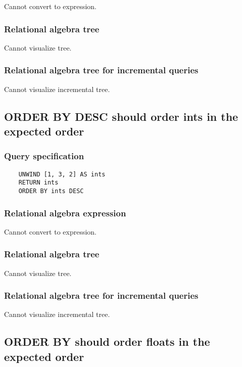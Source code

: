 	Cannot convert to expression.

	\subsubsection*{Relational algebra tree}

	Cannot visualize tree.

	\subsubsection*{Relational algebra tree for incremental queries}

	Cannot visualize incremental tree.
	\subsection{ORDER BY DESC should order ints in the expected order}

	\subsubsection*{Query specification}

	\begin{lstlisting}
	UNWIND [1, 3, 2] AS ints
	RETURN ints
	ORDER BY ints DESC
	\end{lstlisting}


	\subsubsection*{Relational algebra expression}

	Cannot convert to expression.

	\subsubsection*{Relational algebra tree}

	Cannot visualize tree.

	\subsubsection*{Relational algebra tree for incremental queries}

	Cannot visualize incremental tree.
	\subsection{ORDER BY should order floats in the expected order}

